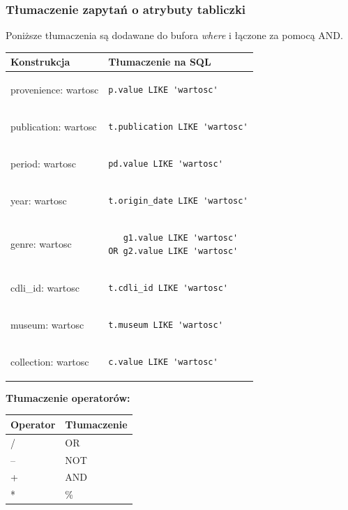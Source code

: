 \subsubsection{Tłumaczenie zapytań o atrybuty tabliczki}
Poniższe tłumaczenia są dodawane do bufora \textit{where} i łączone za pomocą AND.
\begin{longtable}{|p{3in}|p{3in}|}
\hline
{\bf Konstrukcja} & {\bf Tłumaczenie na SQL}\\
\hline
\endhead
provenience: wartosc & \begin{verbatim}p.value LIKE 'wartosc'\end{verbatim}
\\
\hline
publication: wartosc & 
\begin{verbatim}
t.publication LIKE 'wartosc'
\end{verbatim}
\\
\hline
period: wartosc & 
\begin{verbatim}
pd.value LIKE 'wartosc'
\end{verbatim}
\\
\hline
year: wartosc & 
\begin{verbatim}
t.origin_date LIKE 'wartosc'
\end{verbatim}
\\
\hline
genre: wartosc & 
\begin{verbatim}
   g1.value LIKE 'wartosc' 
OR g2.value LIKE 'wartosc'
\end{verbatim}
\\
\hline
cdli\_id: wartosc & 
\begin{verbatim}
t.cdli_id LIKE 'wartosc'
\end{verbatim}
\\
\hline
museum: wartosc & 
\begin{verbatim}
t.museum LIKE 'wartosc'
\end{verbatim}
\\
\hline
collection: wartosc & 
\begin{verbatim}
c.value LIKE 'wartosc'
\end{verbatim}
\\
\hline
\end{longtable}

\textbf{Tłumaczenie operatorów:}
\begin{longtable}{|p{1in}|p{1in}|}
\hline
{\bf Operator} & {\bf Tłumaczenie}\\
\hline
\endhead
/ & OR\\ 
\hline
-- & NOT\\ 
\hline
+ & AND\\ 
\hline
* & \%  \\ 
\hline
\end{longtable}


